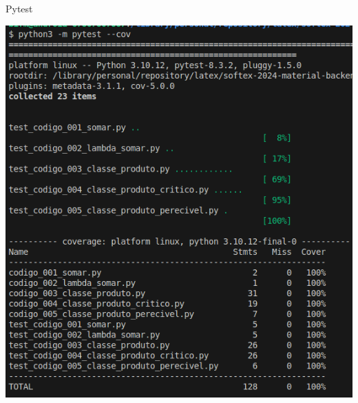 \begin{frame}[t]{Pytest}
	
	
	\vspace{1em}
	\centering
	\includegraphics[scale=0.3]{imagens/fig-result-test-produto-critico.png}
	
\end{frame}









